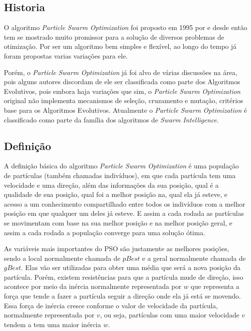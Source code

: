     \subsection{Historia}
        O algoritmo \textit{Particle Swarm Optimization} foi proposto em 1995 por \cite{Kennedy1995} e desde então tem se mostrado muito promissor para a solução de diversos problemas de otimização. Por ser um algoritmo bem simples e flexível, ao longo do tempo já foram propostas varias variações para ele.\hfill\vspace{\onelineskip}
        
        Porém, o \textit{Particle Swarm Optimization} já foi alvo de várias discussões na área, pois alguns autores discordam de ele ser classificada como parte dos Algoritmos Evolutivos, pois embora haja variações que sim, o \textit{Particle Swarm Optimization} original não implementa mecanismos de seleção, cruzamento e mutação, critérios base para os Algoritmos Evolutivos.\newline
        Atualmente o \textit{Particle Swarm Optimization} é classificado como parte da família dos algoritmos de \textit{Swarm Intelligence}.


    \subsection{Definição}
        A definição básica do algoritmo \textit{Particle Swarm Optimization} é uma população de partículas (também chamadas indivíduos), em que cada partícula tem uma velocidade e uma direção, além das informações da sua posição, qual é a qualidade de sua posição, qual foi a melhor posição na, qual ela já esteve, e acesso a um conhecimento compartilhado entre todos os indivíduos com a melhor posição em que qualquer um deles já esteve. E assim a cada rodada as partículas se movimentam com base na sua melhor posição e na melhor posição geral, e assim a cada rodada a população converge para uma solução ótima.\hfill\vspace{\onelineskip}
        
        As variáveis mais importantes do PSO são justamente as melhores posições, sendo a local normalmente chamada de $pBest$ e a geral normalmente chamada de $gBest$. Elas vão ser utilizadas para obter uma média que será a nova posição da partícula. Porém, existem resistências para que a partícula mude de direção, isso acontece por meio da inércia normalmente representada por $w$ que representa a força que tende a fazer a partícula seguir a direção onde ela já está se movendo. Essa força de inércia cresce conforme o valor de velocidade da partícula, normalmente representada por $v$, ou seja, partículas com uma maior velocidade $v$ tendem a tem uma maior inércia $w$.\hfill\vspace{\onelineskip}
        
